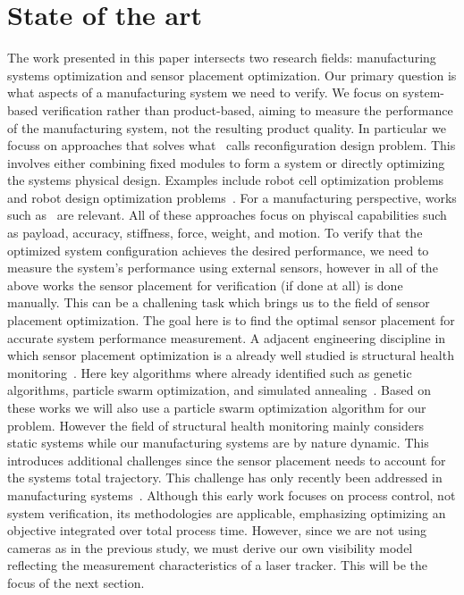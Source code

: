 \documentclass{svproc}
\begin{document}
\section{State of the art}
The work presented in this paper intersects two research fields: manufacturing systems optimization and sensor placement optimization.
Our primary question is what aspects of a manufacturing system we need to verify.
We focus on system-based verification rather than product-based, aiming to measure the performance of the manufacturing system, not the resulting product quality.
In particular we focuss on approaches that solves what~\cite{reconfigurable_production} calls reconfiguration design problem.
This involves either combining fixed modules to form a system or directly optimizing the systems physical design.
Examples include robot cell optimization problems~\cite{previous_work, stiffness_placement} and robot design optimization problems~\cite{task_synthesis, ad-hoc_manipulator, multi_objective}.
For a manufacturing perspective, works such as~\cite{johannes_1, johannes_2} are relevant.
All of these approaches focus on phyiscal capabilities such as payload, accuracy, stiffness, force, weight, and motion.
To verify that the optimized system configuration achieves the desired performance, we need to measure the system's performance using external sensors,
however in all of the above works the sensor placement for verification (if done at all) is done manually.
This can be a challening task which brings us to the field of sensor placement optimization.
The goal here is to find the optimal sensor placement for accurate system performance measurement.
A adjacent engineering discipline in which sensor placement optimization is a already well studied is structural health monitoring~\cite{shms}.
Here key algorithms where already identified such as genetic algorithms, particle swarm optimization, and simulated annealing~\cite{shms}.
Based on these works we will also use a particle swarm optimization algorithm for our problem.
However the field of structural health monitoring mainly considers static systems while our manufacturing systems are by nature dynamic.
This introduces additional challenges since the sensor placement needs to account for the systems total trajectory.
This challenge has only recently been addressed in manufacturing systems~\cite{ieee_sensors}. Although this early work focuses on process control, not system verification, its methodologies are applicable,
emphasizing optimizing an objective integrated over total process time.
However, since we are not using cameras as in the previous study, we must derive our own visibility model reflecting the measurement characteristics of a laser tracker.
This will be the focus of the next section.
\end{document}
